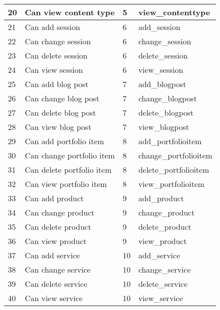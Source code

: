 \begin{longtable}{|l|l|l|l|}
20 & Can view content type & 5 & view\_contenttype \\ \hline 
21 & Can add session & 6 & add\_session \\ \hline 
22 & Can change session & 6 & change\_session \\ \hline 
23 & Can delete session & 6 & delete\_session \\ \hline 
24 & Can view session & 6 & view\_session \\ \hline 
25 & Can add blog post & 7 & add\_blogpost \\ \hline 
26 & Can change blog post & 7 & change\_blogpost \\ \hline 
27 & Can delete blog post & 7 & delete\_blogpost \\ \hline 
28 & Can view blog post & 7 & view\_blogpost \\ \hline 
29 & Can add portfolio item & 8 & add\_portfolioitem \\ \hline 
30 & Can change portfolio item & 8 & change\_portfolioitem \\ \hline 
31 & Can delete portfolio item & 8 & delete\_portfolioitem \\ \hline 
32 & Can view portfolio item & 8 & view\_portfolioitem \\ \hline 
33 & Can add product & 9 & add\_product \\ \hline 
34 & Can change product & 9 & change\_product \\ \hline 
35 & Can delete product & 9 & delete\_product \\ \hline 
36 & Can view product & 9 & view\_product \\ \hline 
37 & Can add service & 10 & add\_service \\ \hline 
38 & Can change service & 10 & change\_service \\ \hline 
39 & Can delete service & 10 & delete\_service \\ \hline 
40 & Can view service & 10 & view\_service \\ \hline 
 \end{longtable}

